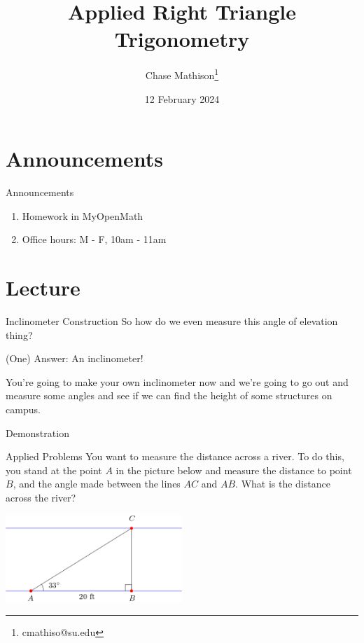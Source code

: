 \documentclass[presentation]{beamer}
\institute[SU]{Shenandoah University}
\author{Chase Mathison\thanks{cmathiso@su.edu}}
\date{12 February 2024}
\title{Applied Right Triangle Trigonometry}
\begin{document}
\maketitle

\section{Announcements}
\label{sec:org6eab4de}
\begin{frame}[label={sec:orgb0c187a}]{Announcements}
\begin{enumerate}
\item Homework in MyOpenMath
\item Office hours: M - F, 10am - 11am
\end{enumerate}
\end{frame}

\section{Lecture}
\label{sec:org9dc4a67}
\begin{frame}[label={sec:org829141a}]{Inclinometer Construction}
So how do we even measure this angle of elevation thing?

(One) Answer: An inclinometer!

You're going to make your own inclinometer now and we're going to go
out and measure some angles and see if we can find the height of some structures on campus.
\end{frame}

\begin{frame}[label={sec:org972b83c}]{Demonstration}
\end{frame}

\begin{frame}[label={sec:orgdf4403c}]{Applied Problems}
You want to measure the distance across a river.  To do this, you stand at the point \(A\)
in the picture below and measure the distance to point \(B\), and the angle made between
the lines \(AC\) and \(AB\).  What is the distance across the river?
\begin{center}
\includegraphics[width=0.5\textwidth]{./riverQ.png}
\end{center}
\end{frame}
\end{document}
